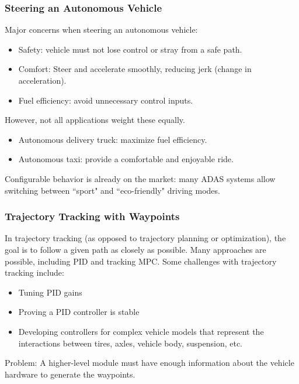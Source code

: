 \documentclass{beamer}
\begin{document}
\begin{frame}
\frametitle{Steering an Autonomous Vehicle}
Major concerns when steering an autonomous vehicle:
\begin{itemize}
\item Safety: vehicle must not lose control or stray from a safe path.
\item Comfort: Steer and accelerate smoothly, reducing jerk (change in acceleration).
\item Fuel efficiency: avoid unnecessary control inputs.
\end{itemize}

However, not all applications weight these equally.
\begin{itemize}
\item Autonomous delivery truck: maximize fuel efficiency.
\item Autonomous taxi: provide a comfortable and enjoyable ride.
\end{itemize}
Configurable behavior is already on the market: many ADAS systems allow switching between ``sport" and ``eco-friendly" driving modes.
\end{frame}


\begin{frame}
	\frametitle{Trajectory Tracking with Waypoints}
In trajectory tracking (as opposed to trajectory planning or optimization), the goal is to follow a given path as closely as possible. Many approaches are possible, including	PID and tracking MPC.
	Some challenges with trajectory tracking include:
	\begin{itemize}
		\item Tuning PID gains
		\item Proving a PID controller is stable
		\item Developing controllers for complex vehicle models that represent the interactions between tires, axles, vehicle body, suspension, etc.
	\end{itemize}
Problem: A higher-level module must have enough information about the vehicle hardware to generate the waypoints.
\end{frame}
	
\end{document}
